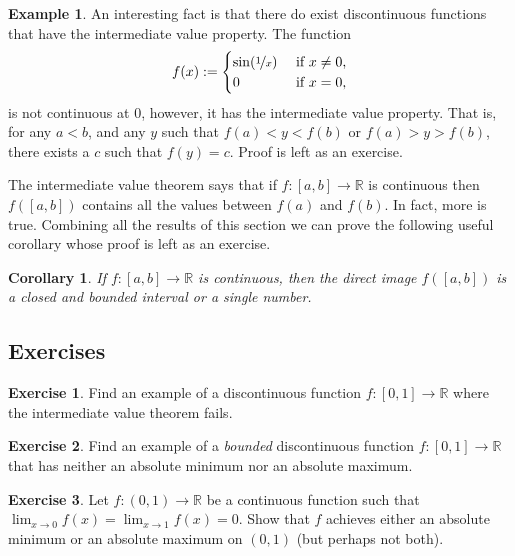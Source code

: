 \documentclass[12pt]{book}
\newcommand{\R}{{\mathbb{R}}}
\theoremstyle{plain}
\newtheorem{cor}[thm]{Corollary}
\theoremstyle{remark}
\theoremstyle{definition}
\theoremstyle{exercise}
\newtheorem{exercise}{Exercise}[section]
\theoremstyle{example}
\newtheorem{example}[thm]{Example}
\begin{document}
\begin{example}
An interesting fact is that there do exist discontinuous functions that have
the intermediate value property.
The function
\begin{equation*}
f(x) :=
\begin{cases}
\sin(\nicefrac{1}{x}) & \text{ if $x \not= 0$,} \\
0 & \text{ if $x=0$,}
\end{cases}
\end{equation*}
is not continuous at 0, however, it has the intermediate value property.
That is, for any $a < b$, and any $y$ such that $f(a) < y < f(b)$
or $f(a) > y > f(b)$,
there exists a $c$ such that $f(y) = c$.
Proof is left as an exercise.
\end{example}

The intermediate value theorem says that if $f \colon [a,b] \to \R$ is
continuous then $f([a,b])$ contains all the values between $f(a)$ and
$f(b)$.  In fact, more is true.  Combining all the results of this section
we can prove the following useful corollary whose proof is left as an exercise.

\begin{cor} \label{cor:imageofinterval}
If $f \colon [a,b] \to \R$ is continuous, then the direct image $f([a,b])$
is a closed and bounded interval or a single number.
\end{cor}

\subsection{Exercises}

\begin{exercise}
Find an example of a discontinuous function $f \colon [0,1] \to \R$
where the intermediate value theorem fails.
\end{exercise}

\begin{exercise}
Find an example of a \emph{bounded} discontinuous function $f \colon [0,1]
\to \R$ that has neither an absolute minimum nor an absolute maximum.
\end{exercise}

\begin{exercise}
Let $f \colon (0,1) \to \R$ be a continuous function such that
$\displaystyle \lim_{x\to 0} f(x) =
\displaystyle \lim_{x\to 1} f(x) = 0$.  Show that
$f$ achieves either an absolute minimum or an absolute maximum on $(0,1)$
(but perhaps not both).
\end{exercise}
\end{document}
